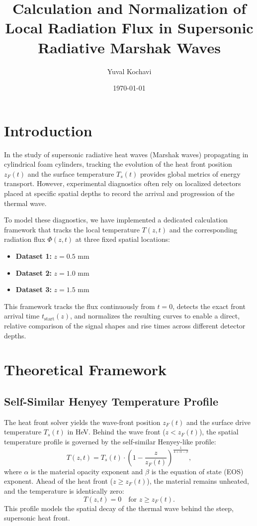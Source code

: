 \documentclass{article}
\title{Calculation and Normalization of Local Radiation Flux in Supersonic Radiative Marshak Waves}
\author{Yuval Kochavi}
\date{\today}
\begin{document}
\maketitle

\section{Introduction}
In the study of supersonic radiative heat waves (Marshak waves) propagating in cylindrical foam cylinders, tracking the evolution of the heat front position $z_F(t)$ and the surface temperature $T_s(t)$ provides global metrics of energy transport. However, experimental diagnostics often rely on localized detectors placed at specific spatial depths to record the arrival and progression of the thermal wave. 

To model these diagnostics, we have implemented a dedicated calculation framework that tracks the local temperature $T(z, t)$ and the corresponding radiation flux $\Phi(z, t)$ at three fixed spatial locations:
\begin{itemize}
    \item \textbf{Dataset 1:} $z = 0.5\text{ mm}$
    \item \textbf{Dataset 2:} $z = 1.0\text{ mm}$
    \item \textbf{Dataset 3:} $z = 1.5\text{ mm}$
\end{itemize}
This framework tracks the flux continuously from $t = 0$, detects the exact front arrival time $t_{\text{start}}(z)$, and normalizes the resulting curves to enable a direct, relative comparison of the signal shapes and rise times across different detector depths.

\section{Theoretical Framework}

\subsection{Self-Similar Henyey Temperature Profile}
The heat front solver yields the wave-front position $z_F(t)$ and the surface drive temperature $T_s(t)$ in HeV. Behind the wave front ($z < z_F(t)$), the spatial temperature profile is governed by the self-similar Henyey-like profile:
\begin{equation}
T(z, t) = T_s(t) \cdot \left( 1 - \frac{z}{z_F(t)} \right)^{\frac{1}{4+\alpha-\beta}},
\end{equation}
where $\alpha$ is the material opacity exponent and $\beta$ is the equation of state (EOS) exponent. Ahead of the heat front ($z \ge z_F(t)$), the material remains unheated, and the temperature is identically zero:
\begin{equation}
T(z, t) = 0 \quad \text{for } z \ge z_F(t).
\end{equation}
This profile models the spatial decay of the thermal wave behind the steep, supersonic heat front.
\end{document}
